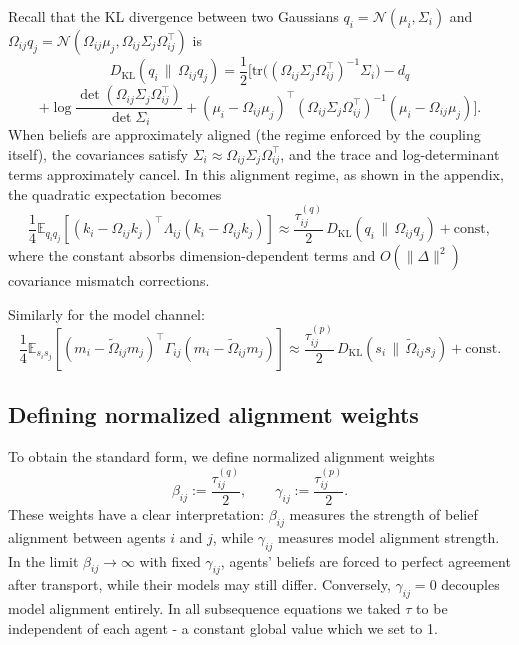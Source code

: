 \documentclass[11pt]{article}
\begin{document}
Recall that the KL divergence between two Gaussians $q_i = \mathcal{N}(\mu_i,\Sigma_i)$ and $\Omega_{ij}q_j = \mathcal{N}(\Omega_{ij}\mu_j, \Omega_{ij}\Sigma_j\Omega_{ij}^\top)$ is
$$
D_{\mathrm{KL}}(q_i\,\|\,\Omega_{ij}q_j)
= \frac{1}{2}
\Big[
\mathrm{tr}\!\big((\Omega_{ij}\Sigma_j\Omega_{ij}^\top)^{-1}\Sigma_i\big)
- d_q
$$
$$
+ \log \frac{\det(\Omega_{ij}\Sigma_j\Omega_{ij}^\top)}{\det \Sigma_i}
+ (\mu_i - \Omega_{ij}\mu_j)^\top
(\Omega_{ij}\Sigma_j\Omega_{ij}^\top)^{-1}
(\mu_i - \Omega_{ij}\mu_j)
\Big].
\label{eq:kl_full}
$$
When beliefs are approximately aligned (the regime enforced by the coupling itself), the covariances satisfy $\Sigma_i \approx \Omega_{ij}\Sigma_j\Omega_{ij}^\top$, and the trace and log-determinant terms approximately cancel. In this alignment regime, as shown in the appendix, the quadratic expectation becomes
\begin{equation}
\frac{1}{4}\mathbb{E}_{q_i q_j}
[(k_i-\Omega_{ij}k_j)^\top\Lambda_{ij}(k_i-\Omega_{ij}k_j)]
\approx
\frac{\tau^{(q)}_{ij}}{2}\,D_{\mathrm{KL}}(q_i\,\|\,\Omega_{ij}q_j)+\text{const},
\label{eq:belief_kl_relation}
\end{equation}
where the constant absorbs dimension-dependent terms and $O(\|\Delta\|^2)$ covariance mismatch corrections.

Similarly for the model channel:
\begin{equation}
\frac{1}{4}\mathbb{E}_{s_i s_j}
[(m_i-\tilde{\Omega}_{ij}m_j)^\top\Gamma_{ij}(m_i-\tilde{\Omega}_{ij}m_j)]
\approx
\frac{\tau^{(p)}_{ij}}{2}\,D_{\mathrm{KL}}(s_i\,\|\,\tilde{\Omega}_{ij}s_j)+\text{const}.
\label{eq:model_kl_relation}
\end{equation}
\subsection{Defining normalized alignment weights}
To obtain the standard form, we define normalized alignment weights
\begin{equation}
\beta_{ij}:=\frac{\tau^{(q)}_{ij}}{2},
\qquad
\gamma_{ij}:=\frac{\tau^{(p)}_{ij}}{2}.
\label{eq:normalized_weights}
\end{equation}
These weights have a clear interpretation: $\beta_{ij}$ measures the strength of belief alignment between agents $i$ and $j$, while $\gamma_{ij}$ measures model alignment strength. In the limit $\beta_{ij} \to \infty$ with fixed $\gamma_{ij}$, agents' beliefs are forced to perfect agreement after transport, while their models may still differ. Conversely, $\gamma_{ij} = 0$ decouples model alignment entirely. In all subsequence equations we taked $\tau$ to be independent of each agent - a constant global value which we set to 1.
\end{document}
